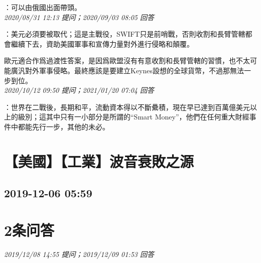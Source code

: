 \documentclass[twocolumn]{ctexart}
\begin{document}
：可以由俄國出面帶頭。
\\

\textit{\hfill\noindent\small 2020/08/31 12:13 提问；2020/09/03 08:05 回答}

：美元必須要被取代；這是主戰役，SWIFT只是前哨戰，否則收割和長臂管轄都會繼續下去，資助美國軍事和宣傳力量對外進行侵略和顛覆。

歐元適合作爲過渡性答案，是因爲歐盟沒有有意收割和長臂管轄的習慣，也不太可能廣汎對外軍事侵略。最終應該是要建立Keynes設想的全球貨幣，不過那無法一步到位。
\\

\textit{\hfill\noindent\small 2020/10/12 09:50 提问；2021/01/20 07:04 回答}

：世界在二戰後，長期和平，流動資本得以不斷纍積，現在早已達到百萬億美元以上的級別；這其中只有一小部分是所謂的“Smart Money”，他們在任何重大財經事件中都能先行一步，其他的未必。
\\


\section{【美國】【工業】波音衰敗之源}
\subsection{2019-12-06 05:59}


\section{2条问答}

\textit{\hfill\noindent\small 2019/12/08 14:55 提问；2019/12/09 01:53 回答}
\end{document}
